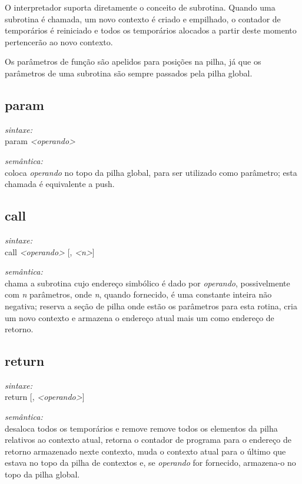 \documentclass[12pt,a4paper,extrafontsizes,article]{memoir}
\newcommand*{\srcfont}{\fontfamily{pcr}\selectfont}
\begin{document}
O interpretador suporta diretamente o conceito de subrotina. Quando uma subrotina é chamada, um novo contexto é criado e
empilhado, o contador de temporários é reiniciado e todos os temporários alocados a partir deste momento pertencerão ao
novo contexto.

Os parâmetros de função são apelidos para posições na pilha, já que os parâmetros de uma subrotina são sempre passados
pela pilha global.


\subsection{\textbf{param}}

\textit{sintaxe:}\\{\srcfont param \textit{<operando>}}

\noindent \textit{semântica:}\\coloca \textit{operando} no topo da pilha global, para ser utilizado como parâmetro;
esta chamada é equivalente a {\srcfont push}.


\subsection{\textbf{call}}

\textit{sintaxe:}\\{\srcfont call \textit{<operando>} [, \textit{<n>}]}

\noindent \textit{semântica:}\\chama a subrotina cujo endereço simbólico é dado por \textit{operando}, possivelmente com
\textit{n} parâmetros, onde \textit{n}, quando fornecido, é uma constante inteira não negativa; reserva a seção de pilha
onde estão os parâmetros para esta rotina, cria um novo contexto e armazena o endereço atual mais um como endereço de
retorno.


\subsection{\textbf{return}}

\textit{sintaxe:}\\{\srcfont return [, \textit{<operando>}]}

\noindent \textit{semântica:}\\desaloca todos os temporários e remove remove todos os elementos da pilha relativos
ao contexto atual, retorna o contador de programa para o endereço de retorno armazenado nexte contexto, muda o contexto
atual para o último que estava no topo da pilha de contextos e, se \textit{operando} for fornecido, armazena-o no topo
da pilha global.
\end{document}
